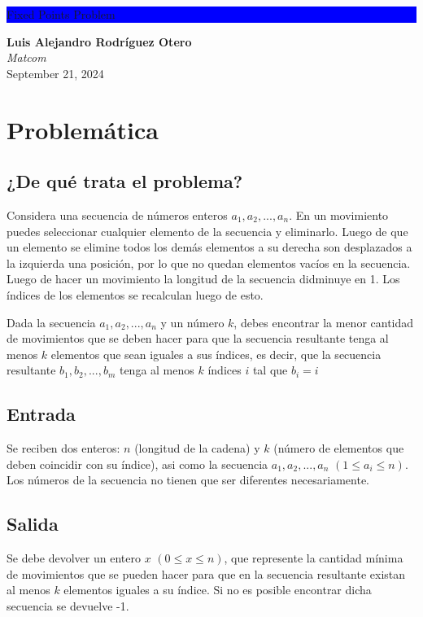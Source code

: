 \documentclass[11pt]{article}
\begin{document}
      \begin{titlepage}
            \centering
            \colorbox{blue}{\parbox{\textwidth}{\centering\color{white}\Huge Fixed Points Problem}}
            \vfill
            \Large
            \textbf{Luis Alejandro Rodríguez Otero} \\
            \textit{Matcom} \\
            September 21, 2024
            \vfill
      \end{titlepage}
    \newpage

    \tableofcontents
    \newpage

    \section{Problemática}
    \subsection{¿De qué trata el problema?}
    Considera una secuencia de números enteros $a_1, a_2, ... , a_n$. En un movimiento puedes seleccionar 
    cualquier elemento de la secuencia y eliminarlo. Luego de que un elemento se elimine todos los demás 
    elementos a su derecha son desplazados a la izquierda una posición, por lo que no quedan elementos vacíos 
    en la secuencia. Luego de hacer un movimiento la longitud de la secuencia didminuye en 1. Los índices 
    de los elementos se recalculan luego de esto.

    Dada la secuencia $a_1, a_2, ... , a_n$ y un número $k$, debes encontrar la menor cantidad de movimientos 
    que se deben hacer para que la secuencia resultante tenga al menos $k$ elementos que sean iguales a sus 
    índices, es decir, que la secuencia resultante $b_1, b_2, ... , b_m$ tenga al menos $k$ índices $i$ tal que 
    $b_i = i$

    \subsection{Entrada}
    Se reciben dos enteros: $n$ (longitud de la cadena) y $k$ (número de elementos que deben coincidir con su índice),
    asi como la secuencia $a_1, a_2, ... , a_n$ $(1 \leq a_i \leq n)$. Los números de la secuencia no tienen 
    que ser diferentes necesariamente.
    
    \subsection{Salida}
    Se debe devolver un entero $x$ $(0 \leq x \leq n)$, que represente la cantidad mínima de movimientos que se
    pueden hacer para que en la secuencia resultante existan al menos $k$ elementos iguales a su índice. Si no
    es posible encontrar dicha secuencia se devuelve -1.
\end{document}
